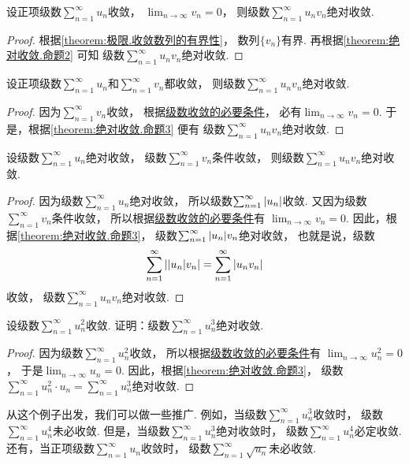 \begin{proposition}\label{theorem:绝对收敛.命题3}
设正项级数\(\sum_{n=1}^\infty u_n\)收敛，
\(\lim_{n\to\infty} v_n = 0\)，
则级数\(\sum_{n=1}^\infty u_n v_n\)绝对收敛.
\begin{proof}
根据\cref{theorem:极限.收敛数列的有界性}，
数列\(\{v_n\}\)有界.
再根据\cref{theorem:绝对收敛.命题2} 可知
级数\(\sum_{n=1}^\infty u_n v_n\)绝对收敛.
\end{proof}
\end{proposition}

\begin{proposition}\label{theorem:绝对收敛.命题4}
设正项级数\(\sum_{n=1}^\infty u_n\)和\(\sum_{n=1}^\infty v_n\)都收敛，
则级数\(\sum_{n=1}^\infty u_n v_n\)绝对收敛.
\begin{proof}
因为\(\sum_{n=1}^\infty v_n\)收敛，
根据\hyperref[theorem:无穷级数.级数收敛的必要条件]{级数收敛的必要条件}，
必有\(\lim_{n\to\infty} v_n = 0\).
于是，根据\cref{theorem:绝对收敛.命题3} 便有
级数\(\sum_{n=1}^\infty u_n v_n\)绝对收敛.
\end{proof}
\end{proposition}

\begin{proposition}\label{theorem:绝对收敛.命题5}
设级数\(\sum_{n=1}^\infty u_n\)绝对收敛，
级数\(\sum_{n=1}^\infty v_n\)条件收敛，
则级数\(\sum_{n=1}^\infty u_n v_n\)绝对收敛.
\begin{proof}
因为级数\(\sum_{n=1}^\infty u_n\)绝对收敛，
所以级数\(\sum_{n=1}^\infty \abs{u_n}\)收敛.
又因为级数\(\sum_{n=1}^\infty v_n\)条件收敛，
所以根据\hyperref[theorem:无穷级数.级数收敛的必要条件]{级数收敛的必要条件}有
\(\lim_{n\to\infty} v_n = 0\).
因此，根据\cref{theorem:绝对收敛.命题3}，
级数\(\sum_{n=1}^\infty \abs{u_n} v_n\)绝对收敛，
也就是说，级数\[
	\sum_{n=1}^\infty \abs{\abs{u_n} v_n}
	= \sum_{n=1}^\infty \abs{u_n v_n}
\]收敛，
级数\(\sum_{n=1}^\infty u_n v_n\)绝对收敛.
\end{proof}
\end{proposition}

\begin{example}
设级数\(\sum_{n=1}^\infty u_n^2\)收敛.
证明：级数\(\sum_{n=1}^\infty u_n^3\)绝对收敛.
\begin{proof}
因为级数\(\sum_{n=1}^\infty u_n^2\)收敛，
所以根据\hyperref[theorem:无穷级数.级数收敛的必要条件]{级数收敛的必要条件}有
\(\lim_{n\to\infty} u_n^2 = 0\)，
于是\(\lim_{n\to\infty} u_n = 0\).
因此，根据\cref{theorem:绝对收敛.命题3}，
级数\(\sum_{n=1}^\infty u_n^2 \cdot u_n
= \sum_{n=1}^\infty u_n^3\)绝对收敛.
\end{proof}
\end{example}
从这个例子出发，我们可以做一些推广.
例如，当级数\(\sum_{n=1}^\infty u_n^3\)收敛时，
级数\(\sum_{n=1}^\infty u_n^4\)未必收敛.
但是，当级数\(\sum_{n=1}^\infty u_n^3\)绝对收敛时，
级数\(\sum_{n=1}^\infty u_n^4\)必定收敛.
还有，当正项级数\(\sum_{n=1}^\infty u_n\)收敛时，
级数\(\sum_{n=1}^\infty \sqrt{u_n}\)未必收敛.

